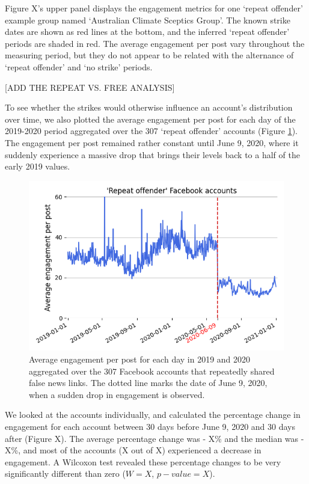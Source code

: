 \documentclass[11pt,a4paper]{article}
\begin{document}
Figure X's upper panel displays the engagement metrics for one `repeat offender' example group named ‘Australian Climate Sceptics Group’. 
The known strike dates are shown as red lines at the bottom, and the inferred ‘repeat offender’ periods are shaded in red. 
The average engagement per post vary throughout the measuring period, but they do not appear to be related with the alternance of `repeat offender' and `no strike' periods.

[ADD THE REPEAT VS. FREE ANALYSIS]

To see whether the strikes would otherwise influence an account's distribution over time, we also plotted the average engagement per post for each day of the 2019-2020 period aggregated over the 307 `repeat offender' accounts (Figure \ref{repeat_average_timeseries}). 
The engagement per post remained rather constant until June 9, 2020, where it suddenly experience a massive drop that brings their levels back to a half of the early 2019 values.

\begin{figure}[!h]
\centering
\includegraphics[width=\linewidth]{./../figure/repeat_average_timeseries.png}
\caption{Average engagement per post for each day in 2019 and 2020 aggregated over the 307 Facebook accounts that repeatedly shared false news links. The dotted line marks the date of June 9, 2020, when a sudden drop in engagement is observed.}
\label{repeat_average_timeseries}
\end{figure}

We looked at the accounts individually, and calculated the percentage change in engagement for each account between 30 days before June 9, 2020 and 30 days after (Figure X). 
The average percentage change was - X\% and the median was - X\%, and most of the accounts (X out of X) experienced a decrease in engagement.
A Wilcoxon test revealed these percentage changes to be very significantly different than zero ($W = X$, $p-value = X$).
\end{document}
